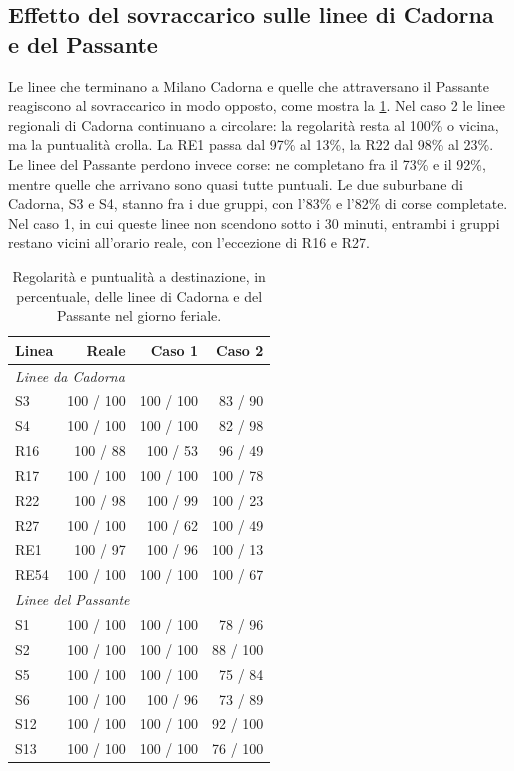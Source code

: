 \subsection{Effetto del sovraccarico sulle linee di Cadorna e del Passante}
Le linee che terminano a Milano Cadorna e quelle che attraversano il Passante reagiscono al sovraccarico in modo opposto, come mostra la \cref{tab:risultati-cadorna-passante}. Nel caso 2 le linee regionali di Cadorna continuano a circolare: la regolarità resta al 100\% o vicina, ma la puntualità crolla. La RE1 passa dal 97\% al 13\%, la R22 dal 98\% al 23\%. Le linee del Passante perdono invece corse: ne completano fra il 73\% e il 92\%, mentre quelle che arrivano sono quasi tutte puntuali. Le due suburbane di Cadorna, S3 e S4, stanno fra i due gruppi, con l'83\% e l'82\% di corse completate. Nel caso 1, in cui queste linee non scendono sotto i 30 minuti, entrambi i gruppi restano vicini all'orario reale, con l'eccezione di R16 e R27.

\begin{table}[H]
	\centering
	\caption{Regolarità e puntualità a destinazione, in percentuale, delle linee di Cadorna e del Passante nel giorno feriale.}
	\label{tab:risultati-cadorna-passante}
	\begin{tabularx}{\textwidth}{Xrrr}
		\toprule
		Linea & Reale & Caso 1 & Caso 2 \\
		\midrule
		\multicolumn{4}{l}{\textit{Linee da Cadorna}} \\
		S3 & 100 / 100 & 100 / 100 & 83 / 90 \\
		S4 & 100 / 100 & 100 / 100 & 82 / 98 \\
		R16 & 100 / 88 & 100 / 53 & 96 / 49 \\
		R17 & 100 / 100 & 100 / 100 & 100 / 78 \\
		R22 & 100 / 98 & 100 / 99 & 100 / 23 \\
		R27 & 100 / 100 & 100 / 62 & 100 / 49 \\
		RE1 & 100 / 97 & 100 / 96 & 100 / 13 \\
		RE54 & 100 / 100 & 100 / 100 & 100 / 67 \\
		\midrule
		\multicolumn{4}{l}{\textit{Linee del Passante}} \\
		S1 & 100 / 100 & 100 / 100 & 78 / 96 \\
		S2 & 100 / 100 & 100 / 100 & 88 / 100 \\
		S5 & 100 / 100 & 100 / 100 & 75 / 84 \\
		S6 & 100 / 100 & 100 / 96 & 73 / 89 \\
		S12 & 100 / 100 & 100 / 100 & 92 / 100 \\
		S13 & 100 / 100 & 100 / 100 & 76 / 100 \\
		\bottomrule
	\end{tabularx}
\end{table}


